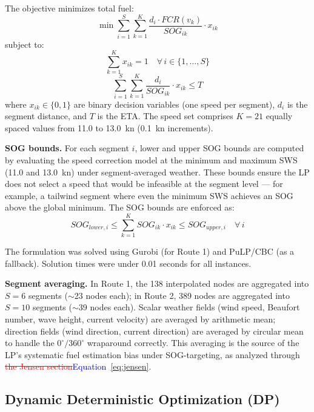 \documentclass[review,authoryear]{elsarticle}  %
\newcommand{\revadd}[1]{\textcolor{blue}{#1}}
\newcommand{\revdel}[1]{\textcolor{red}{\sout{#1}}}
\begin{document}
The objective minimizes total fuel:
\begin{equation}
    \min \sum_{i=1}^{S} \sum_{k=1}^{K} \frac{d_i \cdot FCR(v_k)}{SOG_{ik}} \cdot x_{ik}
    \label{eq:lp-obj}
\end{equation}
subject to:
\begin{equation}
    \sum_{k=1}^{K} x_{ik} = 1 \quad \forall\, i \in \{1, \ldots, S\}
    \label{eq:lp-assign}
\end{equation}
\begin{equation}
    \sum_{i=1}^{S} \sum_{k=1}^{K} \frac{d_i}{SOG_{ik}} \cdot x_{ik} \leq T
    \label{eq:lp-eta}
\end{equation}
where $x_{ik} \in \{0, 1\}$ are binary decision variables (one speed per segment), $d_i$ is the segment distance, and $T$ is the ETA. The speed set comprises $K = 21$ equally spaced values from 11.0 to 13.0~kn (0.1~kn increments).

\textbf{SOG bounds.} For each segment $i$, lower and upper SOG bounds are computed by evaluating the speed correction model at the minimum and maximum SWS (11.0 and 13.0~kn) under segment-averaged weather. These bounds ensure the LP does not select a speed that would be infeasible at the segment level --- for example, a tailwind segment where even the minimum SWS achieves an SOG above the global minimum. The SOG bounds are enforced as:
\begin{equation}
    SOG_{lower,i} \leq \sum_{k=1}^{K} SOG_{ik} \cdot x_{ik} \leq SOG_{upper,i} \quad \forall\, i
    \label{eq:sog-bounds}
\end{equation}

The formulation was solved using Gurobi (for Route 1) and PuLP/CBC (as a fallback). Solution times were under 0.01 seconds for all instances.

\textbf{Segment averaging.} In Route 1, the 138 interpolated nodes are aggregated into $S = 6$ segments ($\sim$23 nodes each); in Route 2, 389 nodes are aggregated into $S = 10$ segments ($\sim$39 nodes each). Scalar weather fields (wind speed, Beaufort number, wave height, current velocity) are averaged by arithmetic mean; direction fields (wind direction, current direction) are averaged by circular mean to handle the $0^\circ/360^\circ$ wraparound correctly. This averaging is the source of the LP's systematic fuel estimation bias under SOG-targeting, as analyzed through \revdel{the Jensen section}\revadd{Equation~\ref{eq:jensen}}.

\subsection{Dynamic Deterministic Optimization (DP)}
\label{sec:dp}
\end{document}
